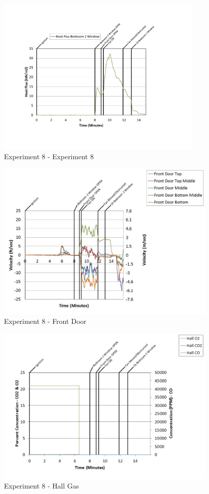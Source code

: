 \documentclass{article}
\begin{document}
\begin{appendices}
	\clearpage

	\begin{figure}[h!]
		\centering
		\includegraphics[height=3.05in]{0_Images/Results_Charts/Exp_8_Charts/Experiment8.pdf}
		\caption{Experiment 8 - Experiment 8}
	\end{figure}
 

	\begin{figure}[h!]
		\centering
		\includegraphics[height=3.05in]{0_Images/Results_Charts/Exp_8_Charts/FrontDoor.pdf}
		\caption{Experiment 8 - Front Door}
	\end{figure}
 
	\clearpage

	\begin{figure}[h!]
		\centering
		\includegraphics[height=3.05in]{0_Images/Results_Charts/Exp_8_Charts/HallGas.pdf}
		\caption{Experiment 8 - Hall Gas}
	\end{figure}
 


\end{appendices}
\end{document}
